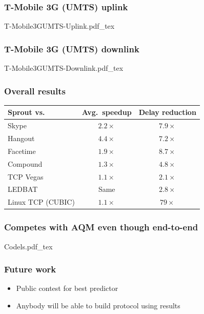 \documentclass[svgnames]{beamer}
\begin{document}
\begin{frame}
\frametitle{T-Mobile 3G (UMTS)  uplink}
\vspace{-1 cm}
\def\svgwidth{\columnwidth}\footnotesize{T-Mobile3GUMTS-Uplink.pdf_tex}
\end{frame}


\begin{frame}
\frametitle{T-Mobile 3G (UMTS) downlink}
\vspace{-1 cm}
\def\svgwidth{\columnwidth}\footnotesize{T-Mobile3GUMTS-Downlink.pdf_tex}
\end{frame}

\begin{frame}
\frametitle{Overall results}

\begin{tabular}{|l|c|c|}
\hline
{\color{blue}Sprout} vs.~ & Avg.~speedup & Delay reduction \\
\hline
\hline
{\color{red}Skype} & $2.2\times$ & $7.9\times$ \\
{\color{red}Hangout} & $4.4\times$ & $7.2\times$ \\
{\color{red}Facetime} & $1.9\times$ & $8.7\times$ \\
\hline
{\color{ForestGreen}Compound} & $1.3\times$ & $4.8\times$ \\
{\color{ForestGreen}TCP Vegas} & $1.1\times$ & $2.1\times$ \\
{\color{ForestGreen}LEDBAT} & Same & $2.8\times$ \\
{\color{ForestGreen}Linux TCP (CUBIC)} & $1.1\times$ & $79\times$ \\
\hline
\end{tabular}

\end{frame}

\begin{frame}
\frametitle{Competes with AQM even though end-to-end}
\vspace{-1 cm}
\def\svgwidth{\columnwidth}\footnotesize{Codels.pdf_tex}
\end{frame}

\begin{frame}
\frametitle{Future work}

\begin{itemize}
\item Public contest for best predictor
\item Anybody will be able to build protocol using results
\end{itemize}
\end{frame}
\end{document}

